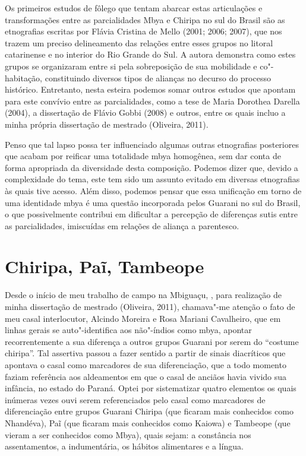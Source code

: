Os primeiros estudos de fôlego que tentam abarcar estas articulações e
transformações entre as parcialidades Mbya e Chiripa no sul do Brasil
são as etnografias escritas por Flávia Cristina de Mello (2001; 2006;
2007), que nos trazem um preciso delineamento das relações entre esses
grupos no litoral catarinense e no interior do Rio Grande do Sul. A
autora demonstra como estes grupos se organizaram entre si pela
sobreposição de sua mobilidade e co"-habitação, constituindo diversos
tipos de alianças no decurso do processo histórico. Entretanto, nesta
esteira podemos somar outros estudos que apontam para este convívio
entre as parcialidades, como a tese de Maria Dorothea Darella (2004), a
dissertação de Flávio Gobbi (2008) e outros, entre os quais incluo a
minha própria dissertação de mestrado (Oliveira, 2011). 

Penso que tal lapso possa ter influenciado algumas outras etnografias
posteriores que acabam por reificar uma totalidade mbya homogênea, sem
dar conta de forma apropriada da diversidade desta composição. Podemos
dizer que, devido a complexidade do tema, este tem sido um assunto
evitado em diversas etnografias às quais tive acesso. Além disso,
podemos pensar que essa unificação em torno de uma identidade mbya é
uma questão incorporada pelos Guarani no sul do Brasil, o que
possivelmente contribui em dificultar a percepção de diferenças sutis
entre as parcialidades, imiscuídas em relações de aliança a parentesco.

\section{Chiripa, Paĩ, Tambeope}

Desde o início de meu trabalho de campo na  Mbiguaçu, , para
realização de minha dissertação de mestrado (Oliveira, 2011),
chamava"-me atenção o fato de meu casal interlocutor, Alcindo Moreira e
Rosa Mariani Cavalheiro, que em linhas gerais se auto"-identifica aos
não"-índios como mbya, apontar recorrentemente a sua diferença a outros
grupos Guarani por serem do ``costume chiripa''. Tal assertiva passou a
fazer sentido a partir de sinais diacríticos que apontava o casal como
marcadores de sua diferenciação, que a todo momento faziam referência
aos aldeamentos em que o casal de anciãos havia vivido sua infância, no
estado do Paraná. Optei por sistematizar quatro elementos os quais
inúmeras vezes ouvi serem referenciados pelo casal como marcadores de
diferenciação entre grupos Guarani Chiripa (que ficaram mais conhecidos
como Nhandéva), Paĩ (que ficaram mais conhecidos
como Kaiowa) e Tambeope (que vieram a ser conhecidos como Mbya), quais
sejam: a constância nos assentamentos, a indumentária, os hábitos
alimentares e a língua. 

